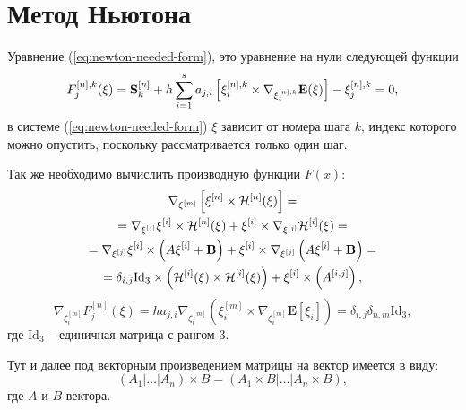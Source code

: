\section{Метод Ньютона}

Уравнение (\ref{eq:newton-needed-form}), это уравнение на нули следующей функции
\begin{equation}
    F^{[n],k}_j(\xi) = \mathbf{S}^{[n]}_k + h\sum_{i=1}^s a_{j,i} \left[ \xi_i^{[n],k}
    \times \nabla_{\xi^{[n],k}_i} \mathbf E(\xi) \right] -
    \xi^{[n],k}_j = 0,
\end{equation}
в системе (\ref{eq:newton-needed-form}) $\xi$ зависит от номера шага $k$, индекс
которого можно опустить, поскольку рассматривается только один шаг.

Так же необходимо вычислить производную функции $F(x)$:
\begin{multline}
    \nabla_{\xi^{[m]}} \left[\xi^{[n]} \times \mathcal{H}^{[n]}(\xi)\right]
    =\\=
    \nabla_{\xi^{[j]}} \xi^{[i]} \times \mathcal{H}^{[n]}(\xi) + \xi^{[i]} \times
    \nabla_{\xi^{[j]}}\mathcal{H}^{[i]}(\xi)
    =\\=
    \nabla_{\xi^{[j]}} \xi^{[i]} \times \left(A\xi^{[i]} + \mathbf B\right) +
    \xi^{[i]} \times
    \nabla_{\xi^{[j]}}\left(A\xi^{[i]} + \mathbf B\right)
    =\\=
    \delta_{i,j} \mathrm{Id}_3
    \times \left(\mathcal{H}^{[i]}(\xi) \times \mathcal{H}^{[i]}(\xi)\right) +
    \xi^{[i]} \times \left(
    A^{[i,j]} \right),
\end{multline}
\begin{equation}
    \nabla_{\xi_i^{[m]}}F^{[n]}_j(\xi) = ha_{j,i}\nabla_{\xi_i^{[m]}}\left(
    \xi_i^{[m]} \times \nabla_{\xi_i^{[m]}}\mathbf E [\xi_i] \right) =
    \delta_{i,j}\delta_{n,m} \mathrm{Id}_3,
\end{equation}
где $\mathrm{Id}_3$ -- единичная матрица с рангом 3.

\begin{remark}
    Тут и далее под векторным произведением матрицы на вектор имеется в виду:
    \begin{equation}
        (A_1|\dots|A_n) \times B = (A_1 \times B |\dots| A_n \times B),
    \end{equation}
    где $A$ и $B$ вектора.
\end{remark}
